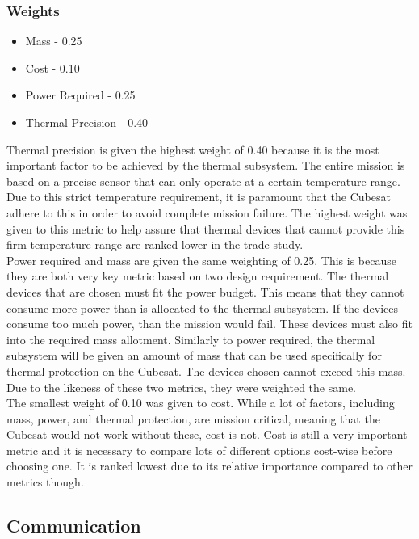 \documentclass{ece}
\begin{document}
\subsubsection{Weights}

\begin{itemize}
    \item Mass - 0.25
    \item Cost - 0.10
    \item Power Required - 0.25
    \item Thermal Precision - 0.40
\end{itemize}

Thermal precision is given the highest weight of 0.40 because it is the most important factor to be achieved by the thermal subsystem.  The entire mission is based on a precise sensor that can only operate at a certain temperature range.  Due to this strict temperature requirement, it is paramount that the Cubesat adhere to this in order to avoid complete mission failure.  The highest weight was given to this metric to help assure that thermal devices that cannot provide this firm temperature range are ranked lower in the trade study.\\

Power required and mass are given the same weighting of 0.25.  This is because they are both very key metric based on two design requirement.  The thermal devices that are chosen must fit the power budget.  This means that they cannot consume more power than is allocated to the thermal subsystem.  If the devices consume too much power, than the mission would fail.  These devices must also fit into the required mass allotment.  Similarly to power required, the thermal subsystem will be given an amount of mass that can be used specifically for thermal protection on the Cubesat.  The devices chosen cannot exceed this mass.  Due to the likeness of these two metrics, they were weighted the same.\\

The smallest weight of 0.10 was given to cost.  While a lot of factors, including mass, power, and thermal protection, are mission critical, meaning that the Cubesat would not work without these, cost is not.  Cost is still a very important metric and it is necessary to compare lots of different options cost-wise before choosing one.  It is ranked lowest due to its relative importance compared to other metrics though.\\
\subsection{Communication}
\end{document}
